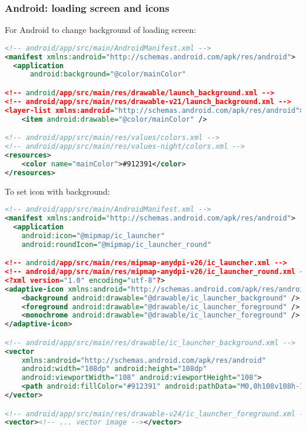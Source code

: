 \subsubsection{Android: loading screen and icons}

For Android to change background of loading screen:

\begin{lstlisting}[language=xml]
<!-- android/app/src/main/AndroidManifest.xml -->
<manifest xmlns:android="http://schemas.android.com/apk/res/android">
  <application
      android:background="@color/mainColor"

<!-- android/app/src/main/res/drawable/launch_background.xml -->
<!-- android/app/src/main/res/drawable-v21/launch_background.xml -->
<layer-list xmlns:android="http://schemas.android.com/apk/res/android">
    <item android:drawable="@color/mainColor" />

<!-- android/app/src/main/res/values/colors.xml -->
<!-- android/app/src/main/res/values-night/colors.xml -->
<resources>
    <color name="mainColor">#912391</color>
</resources>
\end{lstlisting}

To set icon with background:

\begin{lstlisting}[language=xml]
<!-- android/app/src/main/AndroidManifest.xml -->
<manifest xmlns:android="http://schemas.android.com/apk/res/android">
  <application
    android:icon="@mipmap/ic_launcher"
    android:roundIcon="@mipmap/ic_launcher_round"

<!-- android/app/src/main/res/mipmap-anydpi-v26/ic_launcher.xml -->
<!-- android/app/src/main/res/mipmap-anydpi-v26/ic_launcher_round.xml -->
<?xml version="1.0" encoding="utf-8"?>
<adaptive-icon xmlns:android="http://schemas.android.com/apk/res/android">
    <background android:drawable="@drawable/ic_launcher_background" />
    <foreground android:drawable="@drawable/ic_launcher_foreground" />
    <monochrome android:drawable="@drawable/ic_launcher_foreground" />
</adaptive-icon>

<!-- android/app/src/main/res/drawable/ic_launcher_background.xml -->
<vector
    xmlns:android="http://schemas.android.com/apk/res/android"
    android:width="108dp" android:height="108dp"
    android:viewportWidth="108" android:viewportHeight="108">
    <path android:fillColor="#912391" android:pathData="M0,0h108v108h-108z" />
</vector>

<!-- android/app/src/main/res/drawable-v24/ic_launcher_foreground.xml -->
<vector><!-- ... vector image --></vector>
\end{lstlisting}

